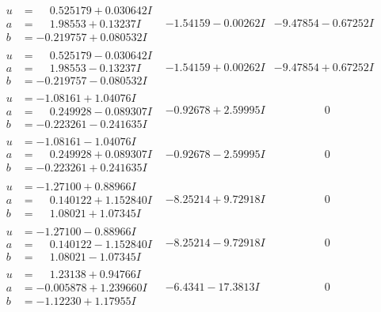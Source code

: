 \documentclass[1p]{elsarticle_modified}
\theoremstyle{definition}
\begin{document}
$$\begin{array}{c|c|c}
\begin{aligned}
u &= \phantom{-}0.525179 + 0.030642 I \\
a &= \phantom{-}1.98553 + 0.13237 I \\
b &= -0.219757 + 0.080532 I\end{aligned}
 & -1.54159 - 0.00262 I & -9.47854 - 0.67252 I \\ \hline\begin{aligned}
u &= \phantom{-}0.525179 - 0.030642 I \\
a &= \phantom{-}1.98553 - 0.13237 I \\
b &= -0.219757 - 0.080532 I\end{aligned}
 & -1.54159 + 0.00262 I & -9.47854 + 0.67252 I \\ \hline\begin{aligned}
u &= -1.08161 + 1.04076 I \\
a &= \phantom{-}0.249928 - 0.089307 I \\
b &= -0.223261 - 0.241635 I\end{aligned}
 & -0.92678 + 2.59995 I & \phantom{-0.000000 } 0 \\ \hline\begin{aligned}
u &= -1.08161 - 1.04076 I \\
a &= \phantom{-}0.249928 + 0.089307 I \\
b &= -0.223261 + 0.241635 I\end{aligned}
 & -0.92678 - 2.59995 I & \phantom{-0.000000 } 0 \\ \hline\begin{aligned}
u &= -1.27100 + 0.88966 I \\
a &= \phantom{-}0.140122 + 1.152840 I \\
b &= \phantom{-}1.08021 + 1.07345 I\end{aligned}
 & -8.25214 + 9.72918 I & \phantom{-0.000000 } 0 \\ \hline\begin{aligned}
u &= -1.27100 - 0.88966 I \\
a &= \phantom{-}0.140122 - 1.152840 I \\
b &= \phantom{-}1.08021 - 1.07345 I\end{aligned}
 & -8.25214 - 9.72918 I & \phantom{-0.000000 } 0 \\ \hline\begin{aligned}
u &= \phantom{-}1.23138 + 0.94766 I \\
a &= -0.005878 + 1.239660 I \\
b &= -1.12230 + 1.17955 I\end{aligned}
 & -6.4341 - 17.3813 I & \phantom{-0.000000 } 0 \\ \hline\begin{aligned}

\end{aligned}
\end{array}$$
\end{document}
